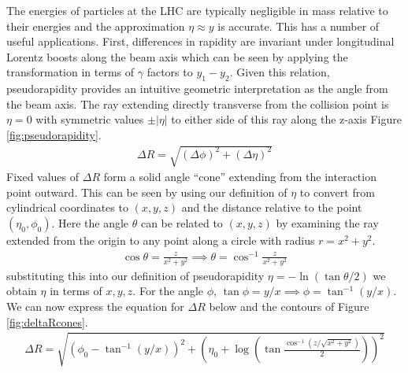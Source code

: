 The energies of particles at the LHC are typically negligible in  mass relative to their energies and the approximation 
$\eta \approx y$ is accurate. This has a number of useful applications. First, differences in rapidity are invariant 
under longitudinal Lorentz boosts along the beam axis which can be seen by applying the transformation
 in terms of $\gamma$ factors to $y_1 - y_2$. Given this relation, pseudorapidity provides an
 intuitive geometric interpretation as the angle from the beam axis. The ray extending directly
 transverse from the collision point is $\eta=0$ with symmetric values $\pm|\eta|$ to either
 side of this ray along the z-axis Figure \ref{fig:pseudorapidity}. 
\begin{align*}
\Delta R = \sqrt{ (\Delta \phi)^2 + (\Delta \eta)^2}
\end{align*}
Fixed values of $\Delta R$ form a solid angle ``cone'' extending from the interaction point outward. This can be seen by
 using our definition of $\eta$ to convert from cylindrical coordinates to $(x,y,z)$ and the distance relative to the point $(\eta_0,\phi_0)$. Here
the angle $\theta$ can be related to $(x,y,z)$ by examining the ray extended from the origin to any point along a circle with radius $r=x^2+y^2$.
\begin{align*}
\cos \theta = \frac{z}{x^2+y^2} \implies \theta = \cos^{-1}\frac{z}{x^2+y^2}
\end{align*} 
substituting this into our definition of pseudorapidity $\eta = -\ln ( \tan \theta / 2)$ we obtain $\eta$ in terms of $x,y,z$. For the angle $\phi$, 
$\tan \phi = y/x \implies  \phi = \tan^{-1}(y/x)$. We can now express the equation for $\Delta R$ below and the contours of Figure \ref{fig:deltaRcones}.
\begin{align*}
\Delta R = \sqrt{ \left( \phi_0 - \tan^{-1} (y/x) \right )^2 + \left ( \eta_0 + \log \left( \tan \frac{\cos^{-1} (z/\sqrt{x^2+y^2})}{2} \right) \right)^2 }
\end{align*}

